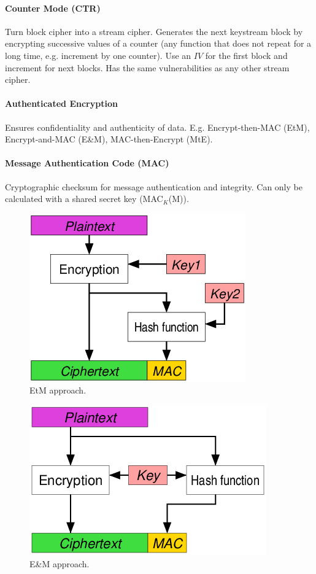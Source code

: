 \paragraph{Counter Mode (CTR)}
Turn block cipher into a stream cipher. Generates the next keystream block by encrypting successive values of a counter (any function that does not repeat for a long time, e.g. increment by one counter). Use an $IV$ for the first block and increment for next blocks. Has the same vulnerabilities as any other stream cipher.

\paragraph{Authenticated Encryption}
Ensures confidentiality and authenticity of data.
E.g. Encrypt-then-MAC (EtM), Encrypt-and-MAC (E\&M), MAC-then-Encrypt (MtE).

\paragraph{Message Authentication Code (MAC)}
Cryptographic checksum for message authentication and integrity. Can only be calculated with a shared secret key (MAC$_K$(M)).

\begin{figure}[h]
	\centering
	\includegraphics[scale=0.4]{images/1-EtM.png}
	\caption{EtM approach.}
	\label{fig:etm}
\end{figure}

\begin{figure}[h]
	\centering
	\includegraphics[scale=0.4]{images/1-EaM.png}
	\caption{E\&M approach.}
	\label{fig:eam}
\end{figure}

